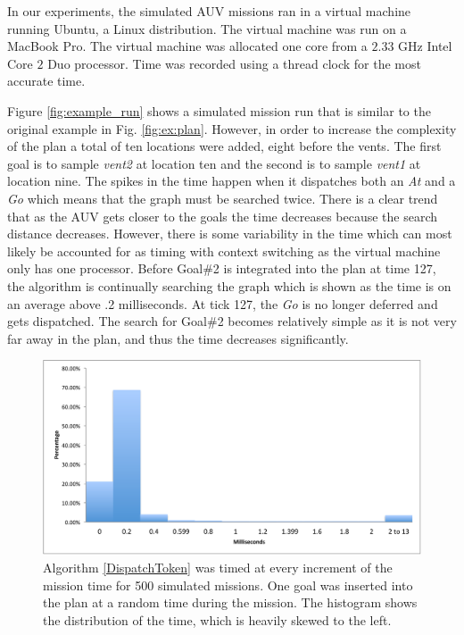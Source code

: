 In our experiments, the simulated AUV missions ran in a virtual
machine running Ubuntu, a Linux distribution. The virtual machine was
run on a MacBook Pro. The virtual machine was allocated one core from
a $2.33$ GHz Intel Core $2$ Duo processor. Time was
recorded using a thread clock for the most accurate time.

Figure \ref{fig:example_run} shows a simulated mission run that
is similar to the original example in Fig. \ref{fig:ex:plan}.
However, in order to increase the complexity of the plan a
total of ten locations were added, eight before the vents. The first goal is to
sample {\em vent2} at location ten and the second is to sample {\em
  vent1} at location nine. The spikes in the time happen when it
dispatches both an {\em At} and a {\em Go} which means that the graph
must be searched twice. There is a clear trend that as the AUV gets
closer to the goals the time decreases because the search distance
decreases.  However, there is some variability in the time which can
most likely be accounted for as timing with context switching as the
virtual machine only has one processor. Before Goal\#2 is integrated
into the plan at time 127, the algorithm is continually searching the
graph which is shown as the time is on an average above .2
milliseconds. At tick 127, the {\em Go} is no longer deferred and gets
dispatched. The search for Goal\#2 becomes relatively simple as it is
not very far away in the plan, and thus the time decreases
significantly.

\begin{figure}[!htbp]
  \centering
  \includegraphics[width=\columnwidth]{figs/HistogramAlg1}
  \caption{\small Algorithm \ref{DispatchToken} was 
  timed at every increment of the mission time for 500 
  simulated missions. One goal was inserted into the plan 
  at a random time during the mission. The histogram shows 
  the distribution of the time, which is heavily skewed to the left.}
  \label{fig:histogram}
\end{figure}

